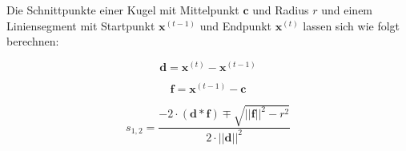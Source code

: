 Die Schnittpunkte einer Kugel mit Mittelpunkt $\textbf{c}$ und Radius $r$ und einem Liniensegment mit Startpunkt  $\textbf{x}^{(t-1)}$ und Endpunkt $\textbf{x}^{(t)}$ lassen sich wie folgt berechnen:

\hspace{-1cm}\begin{minipage}{.333333\linewidth}
	\begin{equation*}
	\textbf{d} = \textbf{x}^{(t)} - \textbf{x}^{(t-1)}
	\end{equation*}
\end{minipage}%
\begin{minipage}{.333333\linewidth}
	\begin{equation*}
	\textbf{f} = \textbf{x}^{(t-1)} - \textbf{c}
	\end{equation*}
\end{minipage}
\begin{minipage}{.333333\linewidth}
	\begin{equation*}
	s_{1,2} = \frac{-2 \cdot (\textbf{d} * \textbf{f}) \mp \sqrt{||\textbf{f}||^2 - r^2}}{2 \cdot ||\textbf{d}||^2}
	\end{equation*}
\end{minipage}
\vspace{0.3cm}

